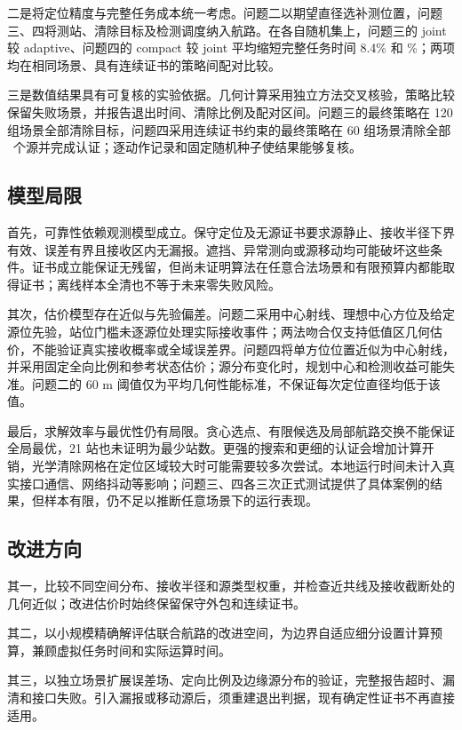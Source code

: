 {\heiti 二是将定位精度与完整任务成本统一考虑。}\songti 问题二以期望直径选补测位置，问题三、四将测站、清除目标及检测调度纳入航路。在各自随机集上，问题三的 \textrm{joint} 较 \textrm{adaptive}、问题四的 \textrm{compact} 较 \textrm{joint} 平均缩短完整任务时间 8.4\% 和 \QFourSaving\%；两项均在相同场景、具有连续证书的策略间配对比较。

{\heiti 三是数值结果具有可复核的实验依据。}\songti 几何计算采用独立方法交叉核验，策略比较保留失败场景，并报告退出时间、清除比例及配对区间。问题三的最终策略在 120 组场景全部清除目标，问题四采用连续证书约束的最终策略在 60 组场景清除全部 \QFourSourceTotal\ 个源并完成认证；逐动作记录和固定随机种子使结果能够复核。

\subsection{模型局限}
{\heiti 首先，可靠性依赖观测模型成立。}\songti 保守定位及无源证书要求源静止、接收半径下界有效、误差有界且接收区内无漏报。遮挡、异常测向或源移动均可能破坏这些条件。证书成立能保证无残留，但尚未证明算法在任意合法场景和有限预算内都能取得证书；离线样本全清也不等于未来零失败风险。

{\heiti 其次，估价模型存在近似与先验偏差。}\songti 问题二采用中心射线、理想中心方位及给定源位先验，站位门槛未逐源位处理实际接收事件；两法吻合仅支持低值区几何估价，不能验证真实接收概率或全域误差界。问题四将单方位位置近似为中心射线，并采用固定全向比例和参考状态估价；源分布变化时，规划中心和检测收益可能失准。问题二的 60 m 阈值仅为平均几何性能标准，不保证每次定位直径均低于该值。

{\heiti 最后，求解效率与最优性仍有局限。}\songti 贪心选点、有限候选及局部航路交换不能保证全局最优，21 站也未证明为最少站数。更强的搜索和更细的认证会增加计算开销，光学清除网格在定位区域较大时可能需要较多次尝试。本地运行时间未计入真实接口通信、网络抖动等影响；问题三、四各三次正式测试提供了具体案例的结果，但样本有限，仍不足以推断任意场景下的运行表现。

\subsection{改进方向}
其一，比较不同空间分布、接收半径和源类型权重，并检查近共线及接收截断处的几何近似；改进估价时始终保留保守外包和连续证书。

其二，以小规模精确解评估联合航路的改进空间，为边界自适应细分设置计算预算，兼顾虚拟任务时间和实际运算时间。

其三，以独立场景扩展误差场、定向比例及边缘源分布的验证，完整报告超时、漏清和接口失败。引入漏报或移动源后，须重建退出判据，现有确定性证书不再直接适用。\label{sec:evaluation-end}
